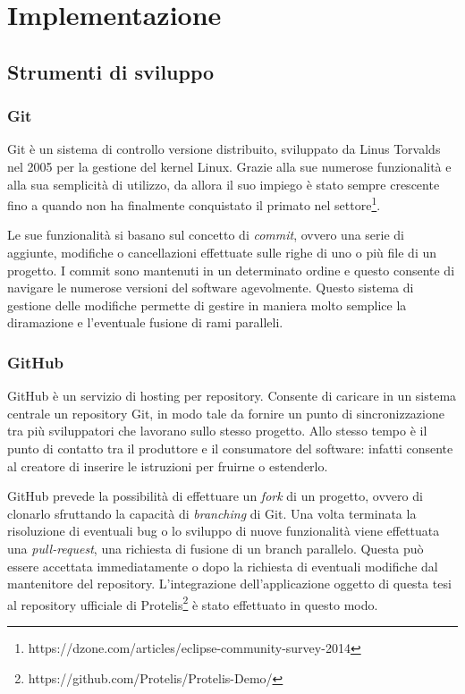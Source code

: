 \section{Implementazione}

\subsection{Strumenti di sviluppo}

\subsubsection{Git}
Git è un sistema di controllo versione distribuito, sviluppato da Linus Torvalds
nel 2005 per la gestione del kernel Linux. Grazie alla sue numerose funzionalità
e alla sua semplicità di utilizzo, da allora il suo impiego è stato sempre
crescente fino a quando non ha finalmente conquistato il primato nel
settore\footnote{https://dzone.com/articles/eclipse-community-survey-2014}.

Le sue funzionalità si basano sul concetto di \textit{commit}, ovvero una serie
di aggiunte, modifiche o cancellazioni effettuate sulle righe di uno o più file
di un progetto. I commit sono mantenuti in un determinato ordine e questo
consente di navigare le numerose versioni del software agevolmente. Questo
sistema di gestione delle modifiche permette di gestire in maniera molto
semplice la diramazione e l'eventuale fusione di rami paralleli.

\subsubsection{GitHub}
GitHub è un servizio di hosting per repository. Consente di caricare in un
sistema centrale un repository Git, in modo tale da fornire un punto di
sincronizzazione tra più sviluppatori che lavorano sullo stesso progetto. Allo
stesso tempo è il punto di contatto tra il produttore e il consumatore del
software: infatti consente al creatore di inserire le istruzioni per fruirne o
estenderlo.

GitHub prevede la possibilità di effettuare un \textit{fork} di un
progetto, ovvero di clonarlo sfruttando la capacità di
\textit{branching} di Git. Una volta terminata la risoluzione di
eventuali bug o lo sviluppo di nuove funzionalità viene effettuata una
\textit{pull-request}, una richiesta di fusione di un branch
parallelo. Questa può essere accettata immediatamente o dopo la
richiesta di eventuali modifiche dal mantenitore del repository.
L'integrazione dell'applicazione oggetto di questa tesi al repository
ufficiale di
Protelis\footnote{https://github.com/Protelis/Protelis-Demo/} è stato
effettuato in questo modo.

